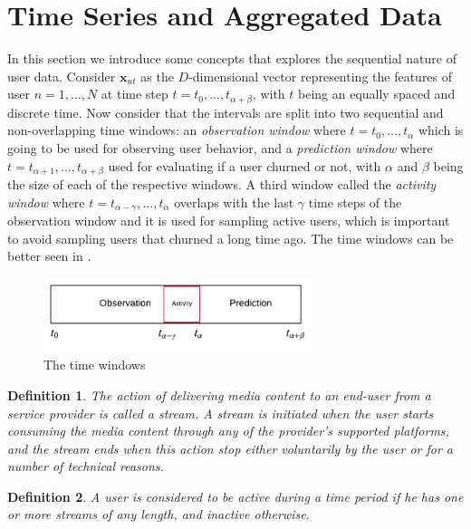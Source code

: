\documentclass{kththesis}
\newtheorem{definition}{Definition}
\begin{document}
\section{Time Series and Aggregated Data}
\label{sec:timewindows}

In this section we introduce some concepts that explores the sequential nature of user data. Consider $\mathbf{x}_{nt}$ as the $D$-dimensional vector representing the features of user $n=1,...,N$ at time step $t = t_0,...,t_{\alpha+\beta}$, with $t$ being an equally spaced and discrete time. Now consider that the intervals are split into two sequential and non-overlapping time windows: an \emph{observation window} where $t = t_0,...,t_\alpha$ which is going to be used for observing user behavior, and a \emph{prediction window} where $t = t_{\alpha+1},...,t_{\alpha+\beta}$ used for evaluating if a user churned or not, with $\alpha$ and $\beta$ being the size of each of the respective windows. A third window called the \emph{activity window} where $t=t_{\alpha-\gamma},...,t_\alpha$ overlaps with the last $\gamma$ time steps of the observation window and it is used for sampling active users, which is important to avoid sampling users that churned a long time ago. The time windows can be better seen in .

\begin{figure}[h]
    \centering
    \includegraphics[width=0.7\textwidth,keepaspectratio]{figures/timewindows.pdf}
    \caption{The time windows}
    \label{fig:timewindows}
\end{figure}

\begin{definition}
The action of delivering media content to an end-user from a service provider is called a \emph{stream}. A stream is initiated when the user starts consuming the media content through any of the provider's supported platforms, and the stream ends when this action stop either voluntarily by the user or for a number of technical reasons.
\end{definition}

\begin{definition}
A user is considered to be \emph{active} during a time period if he has one or more streams of any length, and \emph{inactive} otherwise.
\end{definition}
\end{document}
